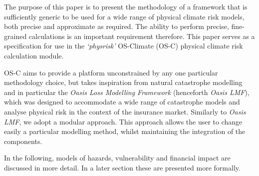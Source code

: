 \documentclass[a4paper,11pt]{extarticle} %
\theoremstyle{definition}
\begin{document}
The purpose of this paper is to present the methodology of a framework that is sufficiently generic to be used for a wide range of physical climate risk models, both precise and approximate as required. The ability to perform precise, fine-grained calculations is an important requirement therefore. This paper serves as a specification for use in the \emph{`physrisk'} OS-Climate (OS-C) \cite{OSC} physical climate risk calculation module.

OS-C aims to provide a platform unconstrained by any one particular methodology choice, but takes inspiration from natural catastrophe modelling \cite{MitchellEtAl:2017} and in particular the \emph{Oasis Loss Modelling Framework} \cite{OasisLMF} (henceforth \emph{Oasis LMF}), which was designed to accommodate a wide range of catastrophe models and analyse physical risk in the context of the insurance market. Similarly to \emph{Oasis LMF}, we adopt a modular approach. This approach allows the user to change easily a particular modelling method, whilst maintaining the integration of the components.

In the following, models of hazards, vulnerability and financial impact are discussed in more detail. In a later section these are presented more formally.
\end{document}
